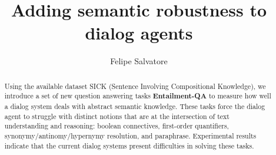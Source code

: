 \documentclass[12pt]{report}
\title{Adding semantic robustness to dialog agents}
\author{Felipe Salvatore}
\begin{document}
\maketitle

\begin{abstract}
Using the available dataset SICK (Sentence Involving Compositional Knowledge), we introduce a set of new question answering tasks \textbf{Entailment-QA} to measure how well a dialog system deals with abstract semantic knowledge. These tasks force the dialog agent to struggle with distinct notions that are at the intersection of text understanding and reasoning: boolean connectives, first-order quantifiers, synonymy/antinomy/hypernymy resolution, and paraphrase. Experimental results indicate that the current dialog systems present difficulties in solving these tasks.
\end{abstract}
\tableofcontents








\end{document}
